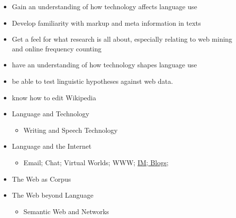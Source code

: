 \documentclass[a4paper,landscape,headrule,footrule,xetex]{foils}
\begin{document}
\begin{itemize}
\item Gain an understanding of how technology affects language use
\item Develop familiarity with markup and meta information in texts
\item Get a feel for what research is all about, especially relating to
  web mining and online frequency counting
\end{itemize}
\begin{itemize}
\item have an understanding of how technology shapes language use
\item be able to test linguistic hypotheses against web data.
\item know how to edit Wikipedia
\end{itemize}






\begin{itemize}
\item Language and Technology
  \begin{itemize}
  \item Writing and Speech Technology
  \end{itemize}
\item Language and the Internet
  \begin{itemize}
  \item Email; Chat; Virtual Worlds; WWW; \ul{IM; Blogs}; 
  \end{itemize}
\item The Web as Corpus
\item The Web beyond Language
  \begin{itemize}
  \item Semantic Web and Networks
  \end{itemize}
\end{itemize}


\end{document}
